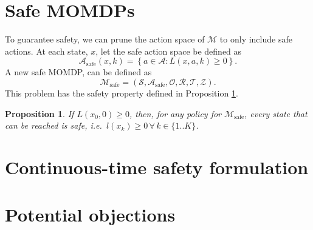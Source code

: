 \documentclass{article}
\newtheorem{prop}{Proposition}
\newcommand{\sspace}{\ensuremath{\mathcal{S}} }
\newcommand{\aspace}{\ensuremath{\mathcal{A}} }
\newcommand{\ospace}{\ensuremath{\mathcal{O}} }
\newcommand{\tdist}{\ensuremath{\mathcal{T}} }
\newcommand{\odist}{\ensuremath{\mathcal{Z}} }
\newcommand{\reward}{\ensuremath{\mathcal{R}} }
\begin{document}
\section{Safe MOMDPs}

To guarantee safety, we can prune the action space of $\mathcal{M}$ to only include safe actions. At each state, $x$, let the safe action space be defined as
\begin{equation}
    \aspace_\text{safe}(x, k) = \left\{a \in \aspace : L(x,a,k) \geq 0 \right\} \text{.}
\end{equation}
A new safe MOMDP, can be defined as
\begin{equation}
    \mathcal{M}_\text{safe} = (\sspace, \aspace_\text{safe}, \ospace, \reward, \tdist, \odist) \text{.}
\end{equation}
This problem has the safety property defined in Proposition \ref{prop:safe}.

\begin{prop}
    If $L(x_0, 0)\geq 0$, then, for any policy for $\mathcal{M}_\text{safe}$, every state that can be reached is safe, i.e.\ $l(x_k) \geq 0 \, \forall\, k \in \{1..K\}$.
    \label{prop:safe}
\end{prop}


%     

% 

\section{Continuous-time safety formulation}


\section{Potential objections}
\end{document}
